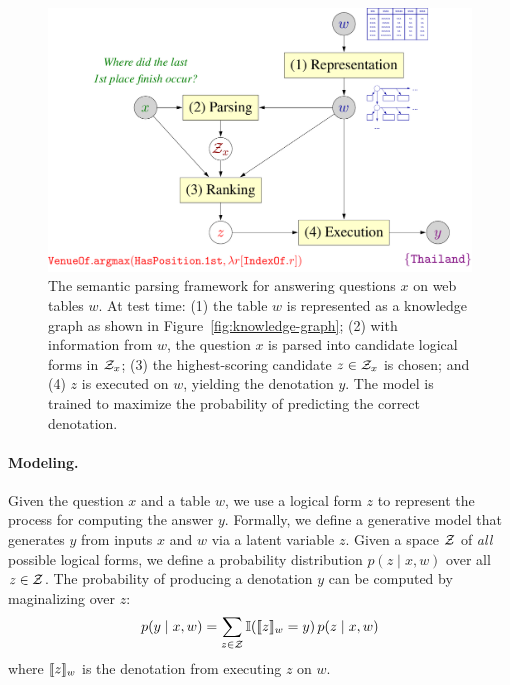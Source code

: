 \begin{figure}[tp]
\centering
\includegraphics[scale=0.4]{sfig/sempre.slides/framework.pdf}
\caption[
The semantic parsing framework for answering questions
on web tables.
]{The semantic parsing framework for answering questions $x$
on web tables $w$.
At test time:
(1) the table $w$ is represented as a knowledge graph
as shown in Figure~\ref{fig:knowledge-graph};
(2) with information from $w$,
the question $x$ is parsed into candidate logical forms in $\mathcal{Z}_x$;
(3) the highest-scoring candidate $z\in\mathcal{Z}_x$ is chosen; and
(4) $z$ is executed on $w$, yielding the denotation $y$.
The model is trained to maximize the probability
of predicting the correct denotation.}
\label{fig:sempre-framework}
\end{figure}

\paragraph{Modeling.}
Given the question $x$ and a table $w$,
we use a logical form $z$
to represent the process for computing the answer $y$.
Formally,
we define a generative model
that generates $y$ from inputs $x$ and $w$
via a latent variable $z$.
Given a space $\mathcal{Z}$ of \emph{all} possible logical forms,
we define a probability distribution
$p(z\mid x, w)$ over all $z \in \mathcal{Z}$.
The probability of producing a denotation $y$ can be computed
by maginalizing over $z$:
\begin{equation}
p(y \mid x, w) =
\sum_{z \in \mathcal{Z}}
\mathbb{I}(\llbracket{z}\rrbracket_{w} = y)\,p(z \mid x, w)
\label{eqn:sempre-model}
\end{equation}
where $\llbracket{z}\rrbracket_{w}$ is the denotation from executing
$z$ on $w$.

